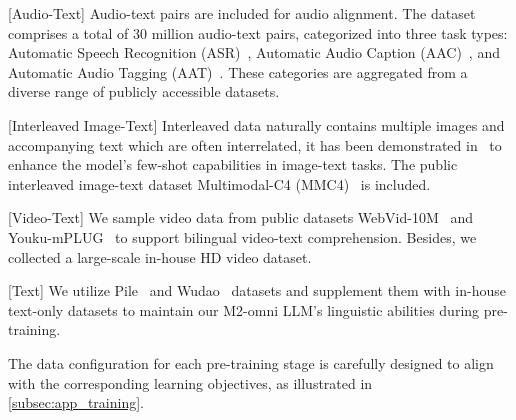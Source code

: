 [Audio-Text] Audio-text pairs are included for audio alignment. The dataset comprises a total of 30 million audio-text pairs, categorized into three task types: Automatic Speech Recognition (ASR)~\cite{Libriheavy, GigaSpeech, Librispeech, CoVoST2, SPGISpeech, TED_LIUM, SlideSpeech, CoVoST2, AISHELL1, WenetSpeech, KeSpeech, AliMeeting, MagicData_RAMC, Primewords_100h, FreeST, TAL, aidatatang_200zh}, Automatic Audio Caption (AAC)~\cite{WavCaps, Clotho, AudioCaps, MACS}, and Automatic Audio Tagging (AAT)~\cite{AudioSet, VGGSound}. These categories are aggregated from a diverse range of publicly accessible datasets.

[Interleaved Image-Text] Interleaved data naturally contains multiple images and accompanying text which are often interrelated, it has been demonstrated in~\cite{sun2024generative,mckinzie2024mm1} to enhance the model's few-shot capabilities in image-text tasks. The public interleaved image-text dataset Multimodal-C4 (MMC4)~\cite{zhu2024multimodal} is included.

[Video-Text] We sample video data from public datasets WebVid-10M~\cite{bain2021frozen} and Youku-mPLUG~\cite{xu2023youku} to support bilingual video-text comprehension. Besides, we collected a large-scale in-house HD video dataset.

[Text] We utilize Pile~\cite{gao2020pile} and Wudao~\cite{yuan2021wudaocorpora} datasets and supplement them with in-house text-only datasets to maintain our M2-omni LLM's linguistic abilities during pre-training.


The data configuration for each pre-training stage is carefully designed to align with the corresponding learning objectives, as illustrated in \cref{subsec:app_training}.

